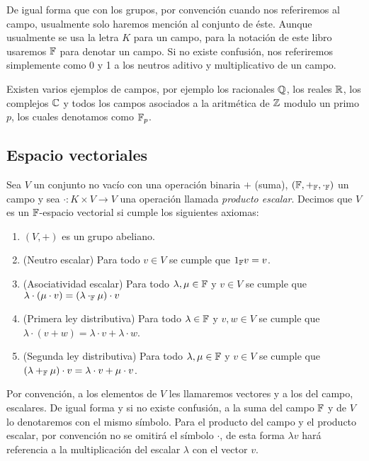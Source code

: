 De igual forma que con los grupos, por convención cuando nos referiremos al campo, usualmente solo haremos mención al conjunto de éste. Aunque usualmente se usa la letra $K$ para un campo, para la notación de este libro usaremos $\mathbb{F}$ para denotar un campo. Si no existe confusión, nos referiremos simplemente como 0 y 1 a los neutros aditivo y multiplicativo de un campo.

Existen varios ejemplos de campos, por ejemplo los racionales $\mathbb{Q}$, los reales $\mathbb{R}$, los complejos $\mathbb{C}$ y todos los campos asociados a la aritmética de $\mathbb{Z}$ modulo un primo $p$, los cuales denotamos como $\mathbb{F}_p$.

\subsection{Espacio vectoriales}

\begin{defi}
  Sea $V$ un conjunto no vacío con una operación binaria $+$ (suma), $(\mathbb{F}, +_{\mathbb{F}}, \cdot_{\mathbb{F}} )$ un campo y sea $\cdot\colon K \times V \to V$ una operación llamada \emph{producto escalar}. Decimos que $V$ es un $\mathbb{F}$-espacio vectorial si cumple los siguientes axiomas:
  \begin{enumerate}
    \item $(V, +)$ es un grupo abeliano.
    \item (Neutro escalar) Para todo $v \in V$ se cumple que $1_{\mathbb{F}} v = v$.
    \item (Asociatividad escalar) Para todo $\lambda, \mu \in \mathbb{F}$ y $v \in V$ se cumple que $\lambda \cdot (\mu \cdot v) = (\lambda \cdot_{\mathbb{F}} \mu)  \cdot v$
    \item (Primera ley distributiva) Para todo $\lambda \in \mathbb{F}$ y $v,w \in V$ se cumple que $\lambda \cdot (v + w) = \lambda \cdot v + \lambda \cdot w$.
    \item (Segunda ley distributiva) Para todo $\lambda, \mu \in \mathbb{F}$ y $v\in V$ se cumple que $(\lambda +_{\mathbb{F}} \mu)\cdot v = \lambda \cdot v + \mu \cdot v$.
  \end{enumerate}
\end{defi}


Por convención, a los elementos de $V$ les llamaremos vectores y a los del campo, escalares. De igual forma y si no existe confusión, a la suma del campo $\mathbb{F}$ y de $V$ lo denotaremos con el mismo símbolo. Para el producto del campo y el producto escalar, por convención no se omitirá el símbolo $\cdot$, de esta forma $\lambda v$ hará referencia a la multiplicación del escalar $\lambda$ con el vector $v$.

